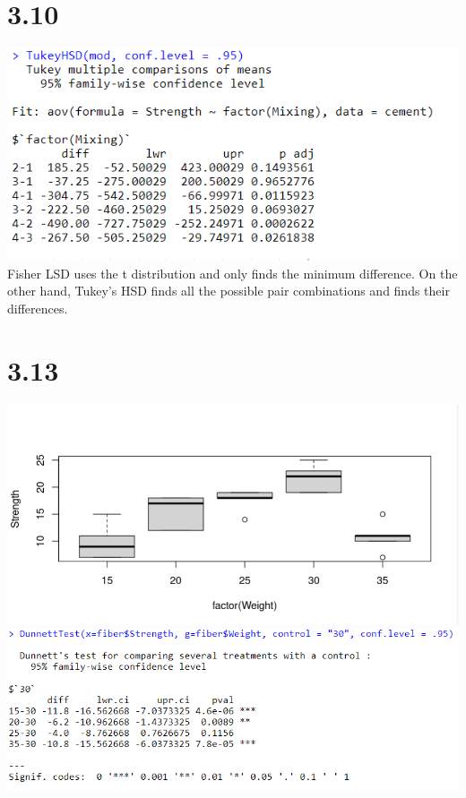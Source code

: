 \documentclass{article}
\begin{document}
\section*{3.10}
\includegraphics{3.10a.PNG}
\\Fisher LSD uses the t distribution and only finds the minimum difference. On the other hand, Tukey's HSD finds all the possible pair combinations and finds their differences.

\section*{3.13}
\includegraphics{13.10bp.PNG}
\\\includegraphics{13.13a.PNG}
\newpage
\end{document}

